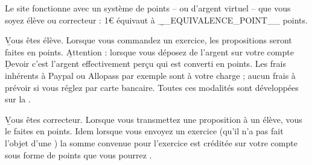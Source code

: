 Le site \eDevoir fonctionne avec un système de points -- ou d'argent virtuel -- que vous soyez élève ou correcteur : 1€ équivaut à \b{__EQUIVALENCE_POINT__ points}.
\item \b{Vous êtes élève}. Lorsque vous commandez un exercice, les propositions seront faites en points. \b{Attention} : lorsque vous déposez de l'argent sur votre compte \b{Devoir} c'est l'argent effectivement perçu qui est converti en points. Les frais inhérents à Paypal ou Allopass par exemple sont à votre charge ; aucun frais à prévoir si vous réglez par carte bancaire. Toutes ces modalités sont développées sur la .
\item \b{Vous êtes correcteur}. Lorsque vous transmettez une proposition à un élève, vous le faites en points. Idem lorsque vous envoyez un exercice (qu'il n'a pas fait l'objet d'une ) la somme convenue pour l'exercice est créditée sur votre compte \eDevoir sous forme de points que vous pourrez .
